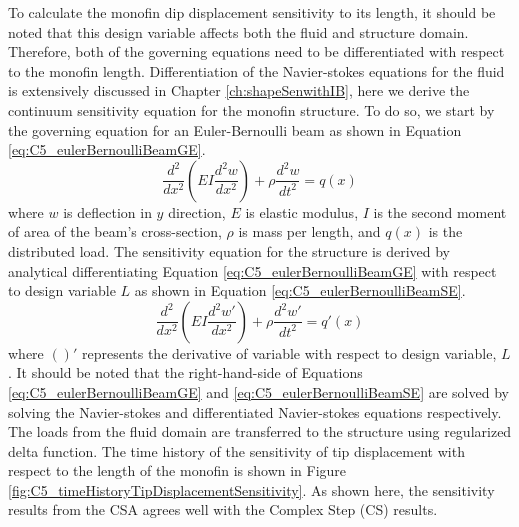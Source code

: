 %
To calculate the monofin dip displacement sensitivity to its length, it should be noted that this design variable affects both the fluid and structure domain. Therefore, both of the governing equations need to be differentiated with respect to the monofin length. Differentiation of the Navier-stokes equations for the fluid is extensively discussed in Chapter \ref{ch:shapeSenwithIB}, here we derive the continuum sensitivity equation for the monofin structure. To do so, we start by the governing equation for an Euler-Bernoulli beam as shown in Equation \eqref{eq:C5_eulerBernoulliBeamGE}.
%
\begin{equation}\label{eq:C5_eulerBernoulliBeamGE}
	\frac{d^2}{dx^2}
	\left( EI \frac{d^2 w}{dx^2} \right) + \rho \frac{d^2 w}{dt^2} = q(x)
\end{equation}
%
where $w$ is deflection in $y$ direction, $E$ is elastic modulus, $I$ is the second moment of area of the beam's cross-section, $\rho$ is mass per length, and $q(x)$ is the distributed load. The sensitivity equation for the structure is derived by analytical differentiating Equation \eqref{eq:C5_eulerBernoulliBeamGE} with respect to design variable $L$ as shown in Equation \eqref{eq:C5_eulerBernoulliBeamSE}.
%
\begin{equation}\label{eq:C5_eulerBernoulliBeamSE}
	\frac{d^2}{dx^2}
	\left( EI \frac{d^2 w'}{dx^2} \right) + \rho \frac{d^2 w'}{dt^2} = q'(x)
\end{equation}
%
where $( )'$ represents the derivative of variable with respect to design variable, $L$. It should be noted that the right-hand-side of Equations \eqref{eq:C5_eulerBernoulliBeamGE} and \eqref{eq:C5_eulerBernoulliBeamSE} are solved by solving the Navier-stokes and differentiated Navier-stokes equations respectively. The loads from the fluid domain are transferred to the structure using regularized delta function. The time history of the sensitivity of tip displacement with respect to the length of the monofin is shown in Figure \ref{fig:C5_timeHistoryTipDisplacementSensitivity}. As shown here, the sensitivity results from the CSA agrees well with the Complex Step (CS) results.
%

